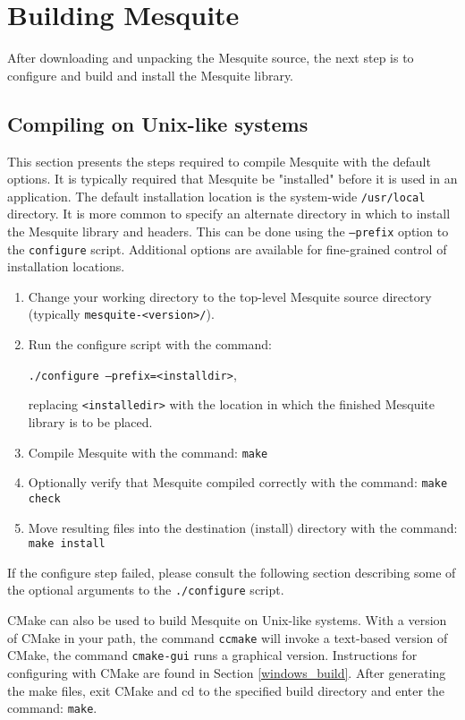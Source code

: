 \section{Building Mesquite}
\label{sec:compiling}
After downloading and unpacking the Mesquite source, the next step is to 
configure and build and install the Mesquite library.  
\subsection{Compiling on Unix-like systems}
This section presents the steps required to compile Mesquite with the default
options.  It is typically required
that Mesquite be "installed" before it is used in an application.  The default 
installation location is the system-wide \texttt{/usr/local} directory.  
It is more common to specify an alternate directory in which to install 
the Mesquite library and headers.  This can be done using the \texttt{--prefix}
option to the \texttt{configure} script.  Additional options are available for
fine-grained control of installation locations.
\begin{enumerate}
\item Change your working directory to the top-level Mesquite source
      directory (typically \texttt{mesquite-<version>/}).
\item Run the configure script with the command: 
\begin{center}
\texttt{./configure --prefix=<installdir>},
\end{center}
      replacing \texttt{<installedir>} with the location in which the finished
      Mesquite library is to be placed.
\item Compile Mesquite with the command: \texttt{make} 
\item Optionally verify that Mesquite compiled correctly with the command: \texttt{make check}
\item Move resulting files into the destination (install) directory with the command: \texttt{make install}
\end{enumerate}
If the configure step failed, please consult the following section describing 
some of the optional arguments to the \texttt{./configure} script. 

CMake can also be used to build Mesquite on Unix-like systems.  With a version of CMake in your path, the command \texttt{ccmake} will invoke a text-based version of CMake, the command \texttt{cmake-gui} runs a graphical version. Instructions for configuring with CMake are found in Section \ref{windows_build}.  After generating the make files, exit CMake and cd to the specified build directory and enter the command: \texttt{make}.  

